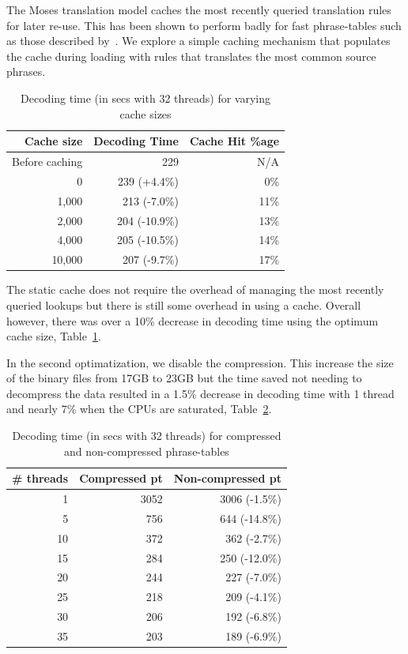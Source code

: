 \documentclass[11pt]{article}
\begin{document}
The Moses translation model caches the most recently queried translation rules for later re-use. This has been shown to perform badly for fast phrase-tables such as those described by~\cite{Bogoychev:Thesis:2013}. We explore a simple caching mechanism that populates the cache during loading with rules that translates the most common source phrases. 
\begin{table}[h]
\small
\begin{center}
\begin{tabular}{|r|r|r|} \hline
Cache size	& Decoding Time & Cache Hit \%age	\\ \hline
Before caching	& 229	& N/A	 \\
0		& 239 (+4.4\%)	& 0\% \\
1,000		& 213 (-7.0\%)	& 11\% \\
2,000		& 204 (-10.9\%)	& 13\% \\
4,000		& 205 (-10.5\%)	& 14\% \\
10,000		& 207 (-9.7\%)	& 17\% \\ \hline
\end{tabular}
\end{center}
\caption{Decoding time (in secs with 32 threads) for varying cache sizes}
\label{tab:cache}
\end{table}
The static cache does not require the overhead of managing the most recently queried lookups but there is still some overhead in using a cache. Overall however, there was over a 10\% decrease in decoding time using the optimum cache size, Table~\ref{tab:cache}.

In the second optimatization, we disable the compression. This increase the size of the binary files from 17GB to 23GB but the time saved not needing to decompress the data resulted in a 1.5\% decrease in decoding time with 1 thread and nearly 7\% when the CPUs are saturated, Table~\ref{tab:compression}.
\begin{table}[h]
\small
\begin{center}
\begin{tabular}{|r|r|r|} \hline
\# threads	& Compressed pt & Non-compressed pt \\ \hline
1		& 3052	& 3006 (-1.5\%) \\
5		& 756	& 644 (-14.8\%) \\
10		& 372	& 362 (-2.7\%) \\
15		& 284	& 250 (-12.0\%) \\
20		& 244	& 227 (-7.0\%) \\
25		& 218	& 209 (-4.1\%) \\
30		& 206	& 192 (-6.8\%) \\
35		& 203	& 189 (-6.9\%) \\ \hline
\end{tabular}
\end{center}
\caption{Decoding time (in secs with 32 threads) for compressed and non-compressed phrase-tables}
\label{tab:compression}
\end{table}
\end{document}
